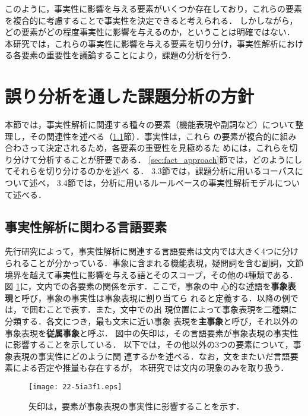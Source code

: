 \documentclass[japanese]{jnlp_1.4}
\def\event#1{}
\begin{document}
このように，事実性に影響を与える要素がいくつか存在しており，これらの要素を複合的に考慮することで事実性を決定できると考えられる．
しかしながら，どの要素がどの程度事実性に影響を与えるのか，ということは明確ではない．
本研究では，これらの事実性に影響を与える要素を切り分け，事実性解析における各要素の重要性を議論することにより，課題の分析を行う．



\section{誤り分析を通した課題分析の方針}
\label{sec_factvalue}

本節では，事実性解析に関連する種々の要素（機能表現や副詞など）について整
理し，その関連性を述べる（\ref{sec:fact_features}節）．事実性は，これら
の要素が複合的に組み合わさって決定されるため，各要素の重要性を見極めるた
めには，これらを切り分けて分析することが肝要である．
\ref{sec:fact_approach}節では，どのようにしてそれらを切り分けるのかを述べ
る．
3.3節では，課題分析に用いるコーパスについて述べ，
3.4節では，分析に用いるルールベースの事実性解析モデルについて述べる．


\subsection{事実性解析に関わる言語要素}
\label{sec:fact_features}

先行研究によって，事実性解析に関連する言語要素は文内では大きく4つに分け
られることが分かっている．事象に含まれる機能表現，疑問詞を含む副詞，文節
境界を越えて事実性に影響を与える語とそのスコープ，その他の4種類である．図
\ref{fig:sent_structure}に，文内での各要素の関係を示す．ここで，事象の中
心的な述語を\textbf{事象表現}と呼び，事象の事実性は事象表現に割り当てら
れると定義する．以降の例では，\event{}で囲むことで表す．また，文中での出
現位置によって事象表現を二種類に分類する．各文につき，最も文末に近い事象
表現を\textbf{主事象}と呼び，それ以外の事象表現を\textbf{従属事象}と呼ぶ．
図中の矢印は，その言語要素が事象表現の事実性に影響することを示している．
以下では，その他以外の3つの要素について，事象表現の事実性にどのように関
連するかを述べる．なお，文をまたいだ言語要素による否定や推量も存在するが，
本研究では文内の現象のみを取り扱う．

\begin{figure}[b]
\begin{center}
 \texttt{[image: 22-5ia3f1.eps]}
\end{center}
\centering\small 矢印は，要素が事象表現の事実性に影響することを示す．
 \label{fig:sent_structure}
\end{figure}
\end{document}

